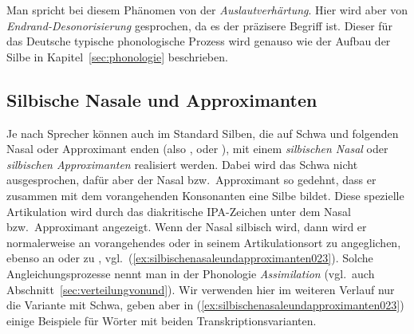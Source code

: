\begin{exe}
  \ex\label{ex:auslautverhaertung011}
  \begin{xlist}
  \end{xlist}
  \ex\label{ex:auslautverhaertung015}
  \begin{xlist}
  \end{xlist}
  \ex\label{ex:auslautverhaertung019}
  \begin{xlist}
  \end{xlist}
\end{exe}

Man spricht bei diesem Phänomen von der \textit{Auslautverhärtung}.
Hier wird aber von \textit{Endrand-Desonorisierung} gesprochen, da es der präzisere Begriff ist.
Dieser für das Deutsche typische phonologische Prozess wird genauso wie der Aufbau der Silbe in Kapitel~\ref{sec:phonologie} beschrieben.

\subsection{Silbische Nasale und Approximanten}
\label{sec:silbischenasaleundapproximanten}

Je nach Sprecher können auch im Standard Silben, die auf Schwa und folgenden Nasal oder Approximant enden (also \textipa{[@n]}, \textipa{[@m]} oder \textipa{[@l]}), mit einem \textit{silbischen Nasal} oder \textit{silbischen Approximanten} realisiert werden.
Dabei wird das Schwa nicht ausgesprochen, dafür aber der Nasal bzw.\ Approximant so gedehnt, dass er zusammen mit dem vorangehenden Konsonanten eine Silbe bildet.
Diese spezielle Artikulation wird durch das diakritische IPA-Zeichen \textipa{[\s{ }]} unter dem Nasal bzw.\ Approximant angezeigt.
Wenn der Nasal \textipa{[n]} silbisch wird, dann wird er normalerweise an vorangehendes \textipa{[b]} oder \textipa{[p]} in seinem Artikulationsort zu \textipa{[m]} angeglichen, ebenso an \textipa{[g]} oder \textipa{[k]} zu \textipa{[N]}, vgl.\ (\ref{ex:silbischenasaleundapproximanten023}).
Solche Angleichungsprozesse nennt man in der Phonologie \textit{Assimilation} (vgl.\ auch Abschnitt~\ref{sec:verteilungvonund}).
Wir verwenden hier im weiteren Verlauf nur die Variante mit Schwa, geben aber in (\ref{ex:silbischenasaleundapproximanten023}) einige Beispiele für Wörter mit beiden Transkriptionsvarianten.

